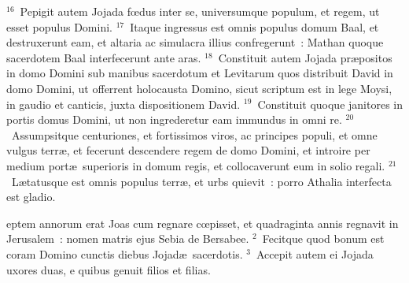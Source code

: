 ${}^{16}$~Pepigit autem Jojada fœdus inter se, universumque populum, et regem, ut esset populus Domini.
${}^{17}$~Itaque ingressus est omnis populus domum Baal, et destruxerunt eam, et altaria ac simulacra illius confregerunt~: Mathan quoque sacerdotem Baal interfecerunt ante aras.
${}^{18}$~Constituit autem Jojada pr\ae positos in domo Domini sub manibus sacerdotum et Levitarum quos distribuit David in domo Domini, ut offerrent holocausta Domino, sicut scriptum est in lege Moysi, in gaudio et canticis, juxta dispositionem David.
${}^{19}$~Constituit quoque janitores in portis domus Domini, ut non ingrederetur eam immundus in omni re.
${}^{20}$~Assumpsitque centuriones, et fortissimos viros, ac principes populi, et omne vulgus terr\ae , et fecerunt descendere regem de domo Domini, et introire per medium port\ae\ superioris in domum regis, et collocaverunt eum in solio regali.
${}^{21}$~L\ae tatusque est omnis populus terr\ae , et urbs quievit~: porro Athalia interfecta est gladio.

\bchapter
{}eptem annorum erat Joas cum regnare cœpisset, et quadraginta annis regnavit in Jerusalem~: nomen matris ejus Sebia de Bersabee.
${}^{2}$~Fecitque quod bonum est coram Domino cunctis diebus Jojad\ae\ sacerdotis.
${}^{3}$~Accepit autem ei Jojada uxores duas, e quibus genuit filios et filias.


